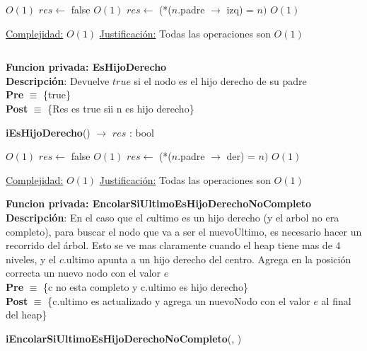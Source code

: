 \begin{Algoritmos}
\begin{algorithm}[H]
\begin{algorithmic}[1]
     \Comment $O(1)$
        \State $res \gets$ false \Comment $O(1)$
    \Else
        \State $res \gets $ (*($n$.padre $\to$ izq) = $n)$ \Comment $O(1)$
    \EndIf

    \medskip
    \Statex \underline{Complejidad:} $O(1)$
    \Statex \underline{Justificaci\'on:} Todas las operaciones son $O(1)$
\end{algorithmic}
\end{algorithm}


$ $\newline

\textbf{Funcion privada: EsHijoDerecho}\\
\textbf{Descripci\'on}: Devuelve $true$ si el nodo es el hijo derecho de su padre\\
\textbf{Pre} $\equiv$ \{true\}\\%
\textbf{Post} $\equiv$ \{Res es true sii n es hijo derecho\}%
\begin{algorithm}[H]
{\textbf{iEsHijoDerecho}() $\to$ $res$ : bool}
\begin{algorithmic}[1]
    
     \Comment $O(1)$
        \State $res \gets$ false \Comment $O(1)$
    \Else
        \State $res \gets $ (*($n$.padre $\to$ der) = $n)$ \Comment $O(1)$
    \EndIf

    \medskip
    \Statex \underline{Complejidad:} $O(1)$
    \Statex \underline{Justificaci\'on:} Todas las operaciones son $O(1)$
\end{algorithmic}
\end{algorithm}



\textbf{Funcion privada: EncolarSiUltimoEsHijoDerechoNoCompleto}\\
\textbf{Descripci\'on}: En el caso que el $c$ultimo es un hijo derecho (y el arbol no era completo), para buscar el nodo que va a ser el nuevoUltimo, es necesario hacer un recorrido del \'arbol. Esto se ve mas claramente cuando el heap tiene mas de 4 niveles, y el $c$.ultimo apunta a un hijo derecho del centro. Agrega en la posici\'on correcta un nuevo nodo con el valor $e$\\
\textbf{Pre} $\equiv$ \{c no esta completo y c.ultimo es hijo derecho\}\\%
\textbf{Post} $\equiv$ \{c.ultimo es actualizado y agrega un nuevoNodo con el valor $e$ al final del heap\}%
\begin{algorithm}[H]
{\textbf{iEncolarSiUltimoEsHijoDerechoNoCompleto}(, )}
\begin{algorithmic}[1]


\end{algorithmic}
\end{algorithm}
\end{Algoritmos}
